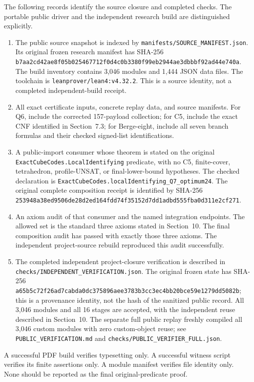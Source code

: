\documentclass[11pt]{article}
\theoremstyle{definition}\newtheorem{definition}[theorem]{Definition}
\theoremstyle{remark}\newtheorem{remark}[theorem]{Remark}
\newcommand{\src}[1]{{\small\nolinkurl{#1}}}
\begin{document}
The following records identify the source closure and completed checks. The portable public driver and the independent research build are distinguished explicitly.
\begin{enumerate}
\item The public source snapshot is indexed by \src{manifests/SOURCE_MANIFEST.json}. Its original frozen research manifest has SHA-256 \src{b7aa2cd42ae8f05b025467712f0d4c0b3380f99eb2944ae3dbbbf92ad44e740a}. The build inventory contains 3,046 modules and 1,444 JSON data files. The toolchain is \src{leanprover/lean4:v4.32.2}. This is a source identity, not a completed independent-build receipt.
\item All exact certificate inputs, concrete replay data, and source manifests. For Q6, include the corrected 157-payload collection; for C5, include the exact CNF identified in Section~7.3; for Berge-eight, include all seven branch formulas and their checked signed-list identifications.
\item A public-import consumer whose theorem is stated on the original \src{ExactCubeCodes.LocalIdentifying} predicate, with no C5, finite-cover, tetrahedron, profile-UNSAT, or final-lower-bound hypotheses. The checked declaration is \src{ExactCubeCodes.localIdentifying_Q7_optimum24}. The original complete composition receipt is identified by SHA-256 \src{253948a38ed9506de28d2ed164fdd74f35152d7dd1adbd555fba0d311e2cf271}.
\item An axiom audit of that consumer and the named integration endpoints. The allowed set is the standard three axioms stated in Section~10. The final composition audit has passed with exactly those three axioms. The independent project-source rebuild reproduced this audit successfully.
\item The completed independent project-closure verification is described in \src{checks/INDEPENDENT_VERIFICATION.json}. The original frozen state has SHA-256 \src{a65b5c72f26ad7cabda0dc375896aee3783b3cc3ec4bb20bce59e1279dd5082b}; this is a provenance identity, not the hash of the sanitized public record. All 3,046 modules and all 16 stages are accepted, with the independent reuse described in Section~10. The separate full public replay freshly compiled all 3,046 custom modules with zero custom-object reuse; see \src{PUBLIC_VERIFICATION.md} and \src{checks/PUBLIC_VERIFIER_FULL.json}.
\end{enumerate}
A successful PDF build verifies typesetting only. A successful witness script verifies its finite assertions only. A module manifest verifies file identity only. None should be reported as the final original-predicate proof.



\end{document}

